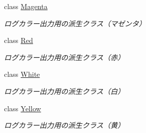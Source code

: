 \begin{DoxyCompactItemize}
class \mbox{\hyperlink{class_g_a_1_1color_1_1_magenta}{Magenta}}
\begin{DoxyCompactList}\small\item\em ログカラー出力用の派生クラス（マゼンタ） \end{DoxyCompactList}\item 
class \mbox{\hyperlink{class_g_a_1_1color_1_1_red}{Red}}
\begin{DoxyCompactList}\small\item\em ログカラー出力用の派生クラス（赤） \end{DoxyCompactList}\item 
class \mbox{\hyperlink{class_g_a_1_1color_1_1_white}{White}}
\begin{DoxyCompactList}\small\item\em ログカラー出力用の派生クラス（白） \end{DoxyCompactList}\item 
class \mbox{\hyperlink{class_g_a_1_1color_1_1_yellow}{Yellow}}
\begin{DoxyCompactList}\small\item\em ログカラー出力用の派生クラス（黄） \end{DoxyCompactList}\end{DoxyCompactItemize}
